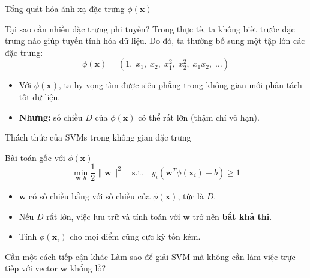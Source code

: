 \begin{frame}{Tổng quát hóa ánh xạ đặc trưng $\phi(\mathbf{x})$}
  \begin{alertblock}{Tại sao cần nhiều đặc trưng phi tuyến?}
    Trong thực tế, ta không biết trước đặc trưng nào giúp tuyến tính hóa dữ liệu. Do đó, ta thường bổ sung một tập lớn các đặc trưng:
    \[
    \phi(\mathbf{x}) = (1,\; x_1,\; x_2,\; x_1^2,\; x_2^2,\; x_1 x_2,\; \dots)
    \]
  \end{alertblock}
  
  \begin{itemize}
    \item Với $\phi(\mathbf{x})$, ta hy vọng tìm được siêu phẳng trong không gian mới phân tách tốt dữ liệu.
    \item \textbf{Nhưng:} số chiều $D$ của $\phi(\mathbf{x})$ có thể rất lớn (thậm chí vô hạn).
  \end{itemize}
\end{frame}

\begin{frame}{Thách thức của SVMs trong không gian đặc trưng}
  \begin{block}{Bài toán gốc với $\phi(\mathbf{x})$}
    \[
    \min_{\mathbf{w}, b} \frac{1}{2}\|\mathbf{w}\|^2 \quad \text{s.t.} \quad y_i(\mathbf{w}^T \phi(\mathbf{x}_i) + b) \ge 1
    \]
  \end{block}
  
  \begin{itemize}
    \item $\mathbf{w}$ có số chiều bằng với số chiều của $\phi(\mathbf{x})$, tức là $D$.
    \item Nếu $D$ rất lớn, việc lưu trữ và tính toán với $\mathbf{w}$ trở nên \textbf{bất khả thi}.
    \item Tính $\phi(\mathbf{x}_i)$ cho mọi điểm cũng cực kỳ tốn kém.
  \end{itemize}
  
  \begin{exampleblock}{Cần một cách tiếp cận khác}
    Làm sao để giải SVM mà không cần làm việc trực tiếp với vector $\mathbf{w}$ khổng lồ?
  \end{exampleblock}
\end{frame}


